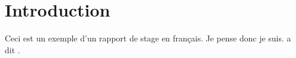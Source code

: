 \section{Introduction}

Ceci est un exemple d'un rapport de stage en français.
\gl Je pense donc je suis. \gr a dit \textcite{descartes1637}.